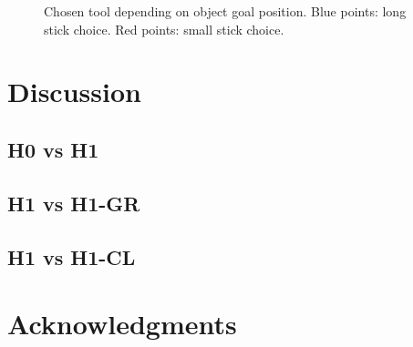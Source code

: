 \documentclass[10pt,letterpaper]{article}
\begin{document}
	
		\begin{figure}[ht]
			\caption{Chosen tool depending on object goal position. Blue points: long stick choice. Red points: small stick choice.}
			\label{res_choice}
		\end{figure}
	
%


\section{Discussion}

	\subsection{H0 vs H1}
	
	

	\subsection{H1 vs H1-GR}
	
	
	
	\subsection{H1 vs H1-CL}
	
	
	
%


\section{Acknowledgments}

%






\setlength{\bibleftmargin}{.125in}
\setlength{\bibindent}{-\bibleftmargin}


\end{document}
